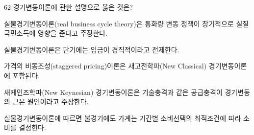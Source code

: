 \begin{question}{62}
경기변동이론에 관한 설명으로 옳은 것은?
\begin{choices}
  \item 실물경기변동이론(real business cycle theory)은 통화량 변동 정책이 장기적으로 실질 국민소득에 영향을 준다고 주장한다.
  \item 실물경기변동이론은 단기에는 임금이 경직적이라고 전제한다.
  \item 가격의 비동조성(staggered pricing)이론은 새고전학파(New Classical) 경기변동이론에 포함된다.
  \item 새케인즈학파(New Keynesian) 경기변동이론은 기술충격과 같은 공급충격이 경기변동의 근본 원인이라고 주장한다.
  \item 실물경기변동이론에 따르면 불경기에도 가계는 기간별 소비선택의 최적조건에 따라 소비를 결정한다.
\end{choices}
\end{question}
